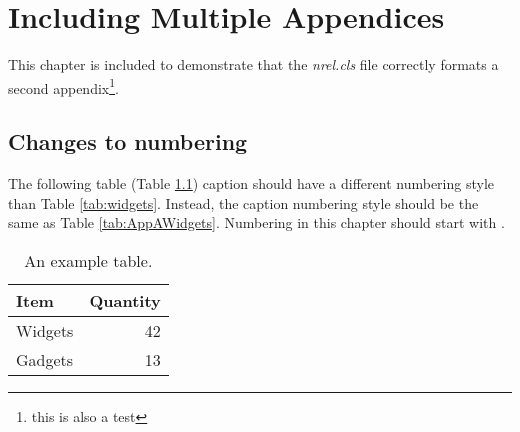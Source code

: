\chapter{Including Multiple Appendices}
This chapter is included to demonstrate that the \emph{nrel.cls} file correctly formats a second appendix\footnote{this is also a test}.

\section{Changes to numbering}
The following table (Table \ref{tab:AppBWidgets}) caption should have a different numbering style than Table \ref{tab:widgets}. Instead, the caption numbering style should be the same as Table \ref{tab:AppAWidgets}. Numbering in this chapter should start with \thechapter.

\begin{table}[!h]
\centering
\caption{An example table.}\label{tab:AppBWidgets}
\begin{tabular}{lr}
Item & Quantity \\
\hline
Widgets & 42 \\
Gadgets & 13
\end{tabular}
\end{table}
